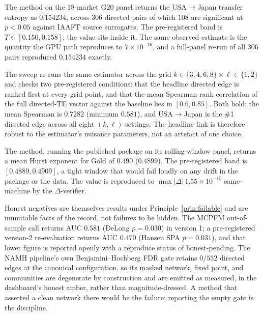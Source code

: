\begin{cexample}
\label{ex:ksg}
The  method on the 18-market G20 panel returns the USA$\to$Japan
transfer entropy as $\mathbf{0.154234}$, across $306$ directed pairs of which $108$ are
significant at $p<0.05$ against IAAFT source surrogates. The pre-registered band is
$T\in[0.150,0.158]$; the value sits inside it. The same observed estimate is the
quantity the GPU path reproduces to $7\times10^{-16}$, and a full-panel re-run of all
$306$ pairs reproduced $0.154234$ exactly.
\end{cexample}

\begin{cexample}
\label{ex:robustness}
The  sweep re-runs the same estimator across the grid
$k\in\{3,4,6,8\}\times\ell\in\{1,2\}$ and checks two pre-registered conditions: that the
headline directed edge is ranked first at every grid point, and that the mean Spearman
rank correlation of the full directed-TE vector against the baseline lies in
$[0.6,0.85]$. Both hold: the mean Spearman is $\mathbf{0.7282}$ (minimum $0.581$), and
USA$\to$Japan is the \#1 directed edge across all eight $(k,\ell)$ settings. The
headline link is therefore robust to the estimator's nuisance parameters, not an
artefact of one choice.
\end{cexample}

\begin{cexample}
\label{ex:namh}
The  method, running the published  package on its
rolling-window panel, returns a mean Hurst exponent for Gold of $\mathbf{0.490}$
($0.4899$). The pre-registered band is $[0.4889,0.4909]$, a tight window that would
fail loudly on any drift in the package or the data. The value is reproduced to
$\max|\Delta|\,1.55\times10^{-15}$ same-machine by the 
$\Delta$-verifier.
\end{cexample}

Honest negatives are themselves results under Principle~\ref{prin:failable} and are
immutable facts of the record, not failures to be hidden. The MCPFM out-of-sample call
returns AUC $0.581$ (DeLong $p=0.030$) in version 1; a pre-registered version-2
re-evaluation returns AUC $0.470$ (Hansen SPA $p=0.031$), and that lower figure is
reported openly with a reproduce status of honest-pending. The NAMH pipeline's own
Benjamini--Hochberg FDR gate retains $0/552$ directed edges at the canonical
configuration, so its masked network, fixed point, and communities are degenerate by
construction and are emitted as measured, in the dashboard's honest amber, rather than
magnitude-dressed. A method that asserted a clean network there would be the failure;
reporting the empty gate is the discipline.

